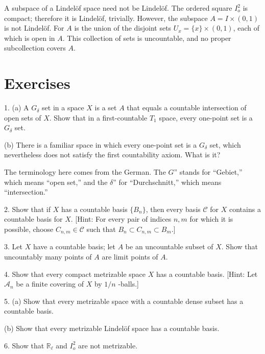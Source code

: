 \begin{centeredblock}
\begin{example}
\label{ex:\thesection.\theexample}
 A subspace of a Lindelöf space need not be Lindelöf. The ordered square \(I_o^{2}\) is compact; therefore it is Lindelöf, trivially. However, the subspace \(A = I \times ( {0,1})\) is not Lindelöf. For \(A\) is the union of the disjoint sets \(U_{x} = \{ x\} \times ( {0,1})\), each of which is open in \(A\). This collection of sets is uncountable, and no proper subcollection covers \(A\).
\end{example}
\end{centeredblock}

\section*{Exercises}

1. (a) A \(G_{\delta }\) set in a space \(X\) is a set \(A\) that equals a countable intersection of open sets of \(X\). Show that in a first-countable \(T_{1}\) space, every one-point set is a \(G_{\delta }\) set.

(b) There is a familiar space in which every one-point set is a \(G_{\delta }\) set, which nevertheless does not satisfy the first countability axiom. What is it?

The terminology here comes from the German. The \(G\)'' stands for ``Gebiet,'' which means ``open set,'' and the \(\delta\)'' for ``Durchschnitt,'' which means ``intersection.''

2. Show that if \(X\) has a countable basis \(\{ B_{n}\}\), then every basis \(\mathcal{C}\) for \(X\) contains a countable basis for \(X\). [Hint: For every pair of indices \(n,m\) for which it is possible, choose \(C_{n,m} \in \mathcal{C}\) such that \(B_{n} \subset {C}_{n,m} \subset {B}_{m}\).]

3. Let \(X\) have a countable basis; let \(A\) be an uncountable subset of \(X\). Show that uncountably many points of \(A\) are limit points of \(A\).

4. Show that every compact metrizable space \(X\) has a countable basis. [Hint: Let \(\mathcal{A}_{n}\) be a finite covering of \(X\) by \(1/n\) -balls.]

5. (a) Show that every metrizable space with a countable dense subset has a countable basis.

(b) Show that every metrizable Lindelöf space has a countable basis.

6. Show that \(\mathbb{R}_{\ell }\) and \(I_o^{2}\) are not metrizable.

